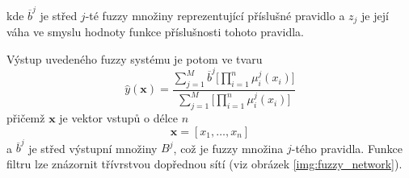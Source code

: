 kde $\overline{b}^j$ je střed $j$-té fuzzy množiny reprezentující příslušné pravidlo a $z_j$ je její váha ve smyslu hodnoty funkce příslušnosti tohoto pravidla.
\par
Výstup uvedeného fuzzy systému je potom ve tvaru
\begin{equation}
    \hat{y}(\textbf{x})=\frac{\sum_{j=1}^M \overline{b}^j\big[\prod_{i=1}^n\mu_i^j(x_i)\big]}{\sum_{j=1}^M\big[\prod_{i=1}^n\mu_i^j(x_i)\big]}
\end{equation}
přičemž $\textbf{x}$ je vektor vstupů o délce $n$
\begin{equation}
    \textbf{x}=[x_1,\dots,x_n]
\end{equation}
a $\overline{b}^j$ je střed výstupní množiny $B^j$, což je fuzzy množina  $j$-tého pravidla. Funkce filtru lze znázornit třívrstvou dopřednou sítí (viz obrázek \ref{img:fuzzy_network}). 
